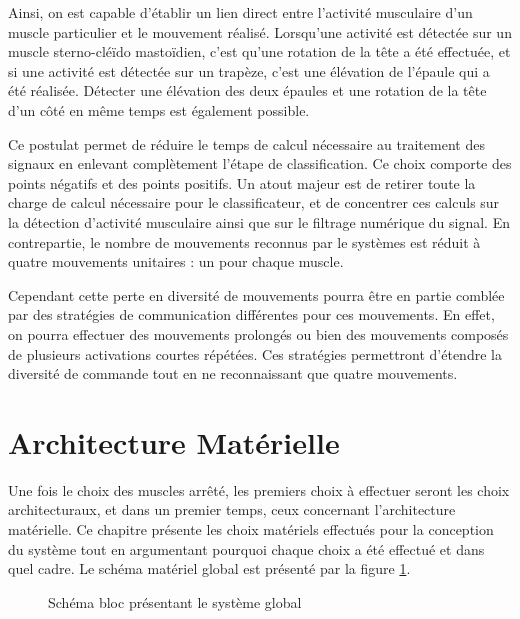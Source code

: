 \documentclass[letterpaper, twoside, 12pt, memoire, creativecommons, hyperref]{thETS}
\begin{document}
Ainsi, on est capable d'établir un lien direct entre l'activité musculaire d'un muscle particulier et le mouvement réalisé. Lorsqu'une activité est détectée sur un muscle sterno-cléïdo mastoïdien, c'est qu'une rotation de la tête a été effectuée, et si une activité est détectée sur un trapèze, c'est une élévation de l'épaule qui a été réalisée. Détecter une élévation des deux épaules et une rotation de la tête d'un côté en même temps est également possible.

Ce postulat permet de réduire le temps de calcul nécessaire au traitement des signaux en enlevant complètement l'étape de classification. Ce choix comporte des points négatifs et des points positifs. Un atout majeur est de retirer toute la charge de calcul nécessaire pour le classificateur, et de concentrer ces calculs sur la détection d'activité musculaire ainsi que sur le filtrage numérique du signal. En contrepartie, le nombre de mouvements reconnus par le systèmes est réduit à quatre mouvements unitaires : un pour chaque muscle. 

Cependant cette perte en diversité de mouvements pourra être en partie comblée par des stratégies de communication différentes pour ces mouvements. En effet, on pourra effectuer des mouvements prolongés ou bien des mouvements composés de plusieurs activations courtes répétées. Ces stratégies permettront d'étendre la diversité de commande tout en ne reconnaissant que quatre mouvements. 


\section{Architecture Matérielle}
\label{CHarchimat}

Une fois le choix des muscles arrêté, les premiers choix à effectuer seront les choix architecturaux, et dans un premier temps, ceux concernant l'architecture matérielle. Ce chapitre présente les choix matériels effectués pour la conception du système tout en argumentant pourquoi chaque choix a été effectué et dans quel cadre. Le schéma matériel global est présenté par la figure \ref{fig:archiMatTot}.

\begin{figure}
	\centering
	\caption{Schéma bloc présentant le système global}
	\label{fig:archiMatTot}
\end{figure}
\end{document}
